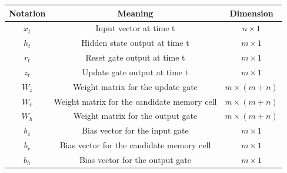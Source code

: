 \documentclass[12pt,a4paper]{article}
\begin{document}
\begin{longtable}{|c|c|c|}
    \hline
    \textbf{Notation} & \textbf{Meaning} & \textbf{Dimension}\\
    \hline
    $x_t$               & Input vector at time t                        & $n \times 1$\\
    $h_t$               & Hidden state output at time t                 & $m \times 1$\\
    $r_t$               & Reset gate output at time t                   & $m \times 1$\\
    $z_t$               & Update gate output at time t                  & $m \times 1$\\
    $W_z$               & Weight matrix for the update gate             & $m \times (m+n)$\\
    $W_r$               & Weight matrix for the candidate memory cell   & $m \times (m+n)$\\
    $W_h$               & Weight matrix for the output gate             & $m \times (m+n)$\\
    $b_z$               & Bias vector for the input gate                & $m \times 1$\\
    $b_r$               & Bias vector for the candidate memory cell     & $m \times 1$\\
    $b_h$               & Bias vector for the output gate               & $m \times 1$\\
    \hline
\end{longtable}
\newpage
\end{document}
